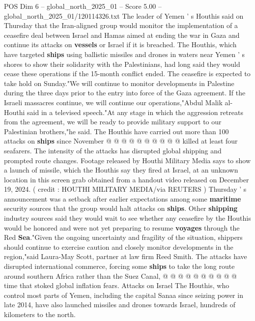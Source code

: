 \begin{textsample}{POS Dim 6 – global\_north\_2025\_01 – Score 5.00 – global\_north\_2025\_01/120114326.txt}  \label{ex:f6_pos_345}
The leader of Yemen ' s Houthis said on Thursday that the Iran-aligned group would monitor the implementation of a ceasefire deal between Israel and Hamas aimed at ending the war in Gaza and continue its attacks on \textbf{vessels} or Israel if it is breached.
The Houthis, which have targeted \textbf{ships} using ballistic missiles and drones in waters near Yemen ' s shores to show their solidarity with the Palestinians, had long said they would cease these operations if the 15-month conflict ended.
The ceasefire is expected to take hold on Sunday."We will continue to monitor developments in Palestine during the three days prior to the entry into force of the Gaza agreement.
If the Israeli massacres continue, we will continue our operations,"Abdul Malik al-Houthi said in a televised speech."At any stage in which the aggression retreats from the agreement, we will be ready to provide military support to our Palestinian brothers,"he said.
The Houthis have carried out more than 100 attacks on \textbf{ships} since November @ @ @ @ @ @ @ @ @ @ killed at least four seafarers.
The intensity of the attacks has disrupted global shipping and prompted route changes.
Footage released by Houthi Military Media says to show a launch of missile, which the Houthis say they fired at Israel, at an unknown location in this screen grab obtained from a handout video released on December 19, 2024. ( credit : HOUTHI MILITARY MEDIA/via REUTERS ) Thursday ' s announcement was a setback after earlier expectations among some \textbf{maritime} security sources that the group would halt attacks on \textbf{ships}.
Other \textbf{shipping} industry sources said they would wait to see whether any ceasefire by the Houthis would be honored and were not yet preparing to resume \textbf{voyages} through the Red \textbf{Sea}."Given the ongoing uncertainty and fragility of the situation, shippers should continue to exercise caution and closely monitor developments in the region,"said Laura-May Scott, partner at law firm Reed Smith.
The attacks have disrupted international commerce, forcing some \textbf{ships} to take the long route around southern Africa rather than the Suez Canal, @ @ @ @ @ @ @ @ @ @ time that stoked global inflation fears.
Attacks on Israel The Houthis, who control most parts of Yemen, including the capital Sanaa since seizing power in late 2014, have also launched missiles and drones towards Israel, hundreds of kilometers to the north.

\end{textsample}
